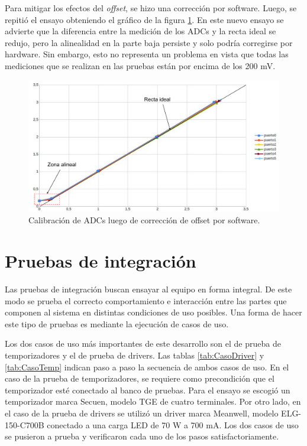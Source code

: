 Para mitigar los efectos del \textit{offset}, se hizo una corrección por software. 
Luego, se repitió el ensayo obteniendo el gráfico de la figura \ref{fig:CorregidoCalADCzoom}. En este nuevo ensayo se advierte que la diferencia entre la medición de los ADCs y la recta ideal se redujo, pero la alinealidad en la parte baja persiste y solo podría corregirse por hardware. Sin embargo, esto no representa un problema en vista que todas las mediciones que se realizan en las pruebas están por encima de los 200 mV.

\begin{figure}[H]
	\centering
	\includegraphics[width=1\textwidth]{./Figures/CorregidoCalADCzoom.pdf}
	\caption{Calibración de ADCs luego de corrección de offset por software.}
	\label{fig:CorregidoCalADCzoom}
\end{figure}


\section{Pruebas de integración}

Las pruebas de integración buscan ensayar al equipo en forma integral. De este modo se prueba el correcto comportamiento e interacción entre las partes que componen al sistema en distintas  condiciones de uso posibles. 
Una forma de hacer este tipo de pruebas es mediante la ejecución de casos de uso.

Los dos casos de uso más importantes de este desarrollo son el de prueba de temporizadores y el de prueba de drivers. Las tablas \ref{tab:CasoDriver} y \ref{tab:CasoTemp} indican paso a paso la secuencia de ambos casos de uso.
En el caso de la prueba de temporizadores, se requiere como precondición que el temporizador esté conectado al banco de pruebas. Para el ensayo se escogió un temporizador marca Secuen, modelo TGE de cuatro terminales.
Por otro lado, en el caso de la prueba de drivers se utilizó un driver marca Meanwell, modelo ELG-150-C700B conectado a una carga LED de 70 W a 700 mA.
Los dos casos de uso se pusieron a prueba y verificaron cada uno de los pasos satisfactoriamente.



